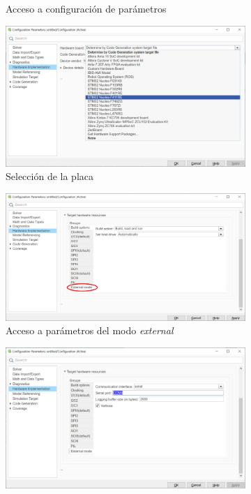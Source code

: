 \documentclass[10pt,a4paper]{report}
\begin{document}
\begin{figure}
\begin{subfigure}{0.5\textwidth}
\caption{Acceso a configuración de parámetros}\label{f17c}
\end{subfigure}
\begin{subfigure}{0.5\textwidth}
\centering
\includegraphics[width = \linewidth]{eje4.jpg}
\caption{Selección de la placa}\label{f17d}
\end{subfigure}
\begin{subfigure}{0.5\textwidth}
\centering
\includegraphics[width = \linewidth]{eje5.jpg}
\caption{Acceso a parámetros del modo \emph{external}}\label{f17e}
\end{subfigure}
\begin{subfigure}{0.5\textwidth}
\centering
\includegraphics[width = \linewidth]{eje6.jpg}

\end{subfigure}
\end{figure}
\end{document}
